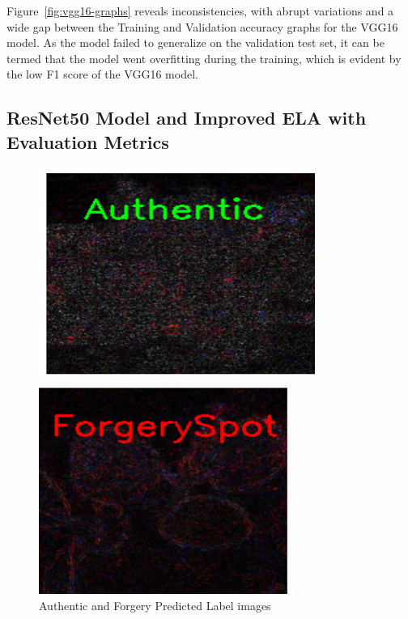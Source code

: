 \documentclass{ieeeaccess}
\begin{document}
  Figure~\ref{fig:vgg16-graphs} reveals inconsistencies, with abrupt variations and a wide gap between the Training and Validation accuracy graphs for the VGG16 model. As the model failed to generalize on the validation test set, it can be termed that the model went overfitting during the training, which is evident by the low F1 score of the VGG16 model.
  
\subsection{ResNet50 Model and Improved ELA with Evaluation Metrics}
    \begin{figure}[h!]
  	\centering
  	\begin{minipage}{0.23\textwidth}
  		\centering
  		\includegraphics[width=\linewidth]{Authentic_img.png}
  	\end{minipage}
  	\hfill
  	\begin{minipage}{0.21\textwidth}
  		\centering
  		\includegraphics[width=\linewidth]{Forgery_img.png}
  		
  	\end{minipage}
  	\caption{Authentic and Forgery Predicted Label images}
  	\label{fig:Authentic_and_ELA}
  \end{figure}
  
\end{document}
